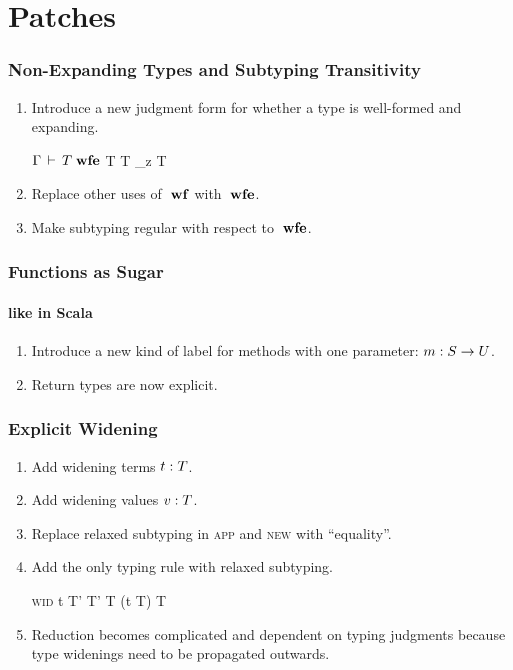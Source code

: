 \documentclass{beamer}
\begin{document}
\section{Patches}
\frame{\tableofcontents[currentsection]}

\begin{frame}
\frametitle{Non-Expanding Types and Subtyping Transitivity}
\begin{enumerate}
\item Introduce a new judgment form for whether a type is well-formed and expanding.
\begin{block}{$\Gamma \,\vdash\, T \;\mbox{\textbf{wfe}}$}
  \infrule
  {\Gamma \ts T \wf \spcomma T \expand_z }
  {\Gamma \ts T \wfe}
\end{block}
\item Replace other uses of $\;\mbox{\textbf{wf}}$ with $\;\mbox{\textbf{wfe}}$.
\item Make subtyping regular with respect to $\;\mbox{\textbf{wfe}}$.
\end{enumerate}
\end{frame}

\begin{frame}
\frametitle{Functions as Sugar}
\framesubtitle{like in Scala}
\begin{enumerate}
\item Introduce a new kind of label for methods with one parameter: $m : S \rightarrow U$.
\item Return types are now explicit.
\end{enumerate}
\end{frame}

\begin{frame}
\frametitle{Explicit Widening}
\begin{enumerate}
\item Add widening terms $t : T$.
\item Add widening values $v : T$.
\item Replace relaxed subtyping in \textsc{app} and \textsc{new} with
  ``equality''.
\item Add the only typing rule with relaxed subtyping.
\begin{block}{\textsc{wid}}
  \infrule
  {\Gamma \ts t \typ T' \spcomma T' \sub T}
  {\Gamma \ts (\wid t T) \typ T}
\end{block}
\item Reduction becomes complicated and dependent on typing judgments
  because type widenings need to be propagated outwards.
\end{enumerate}
\end{frame}
\end{document}
